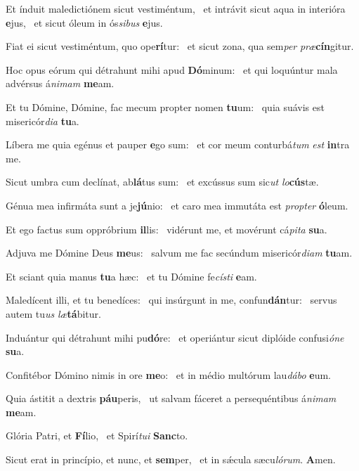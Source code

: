 \item Et índuit maledictiónem sicut vestiméntum,~\pscross{} et intrávit sicut aqua in interióra \textbf{e}jus,~\psstar{} et sicut óleum in ós\textit{sibus} \textbf{e}jus.
\item Fiat ei sicut vestiméntum, quo ope\textbf{rí}tur:~\psstar{} et sicut zona, qua sem\textit{per} \textit{præ}\textbf{cín}gitur.
\item Hoc opus eórum qui détrahunt mihi apud \textbf{Dó}minum:~\psstar{} et qui loquúntur mala advérsus á\textit{nimam} \textbf{me}am.
\item Et tu Dómine, Dómine, fac mecum propter nomen \textbf{tu}um:~\psstar{} quia suávis est misericór\textit{dia} \textbf{tu}a.
\item Líbera me quia egénus et pauper \textbf{e}go sum:~\psstar{} et cor meum conturbá\textit{tum} \textit{est} \textbf{in}tra me.
\item Sicut umbra cum declínat, ab\textbf{lá}tus sum:~\psstar{} et excússus sum sic\textit{ut} \textit{lo}\textbf{cús}tæ.
\item Génua mea infirmáta sunt a je\textbf{jú}nio:~\psstar{} et caro mea immutáta est \textit{propter} \textbf{ó}leum.
\item Et ego factus sum oppróbrium \textbf{il}lis:~\psstar{} vidérunt me, et movérunt cá\textit{pita} \textbf{su}a.
\item Adjuva me Dómine Deus \textbf{me}us:~\psstar{} salvum me fac secúndum misericór\textit{diam} \textbf{tu}am.
\item Et sciant quia manus \textbf{tu}a hæc:~\psstar{} et tu Dómine fe\textit{císti} \textbf{e}am.
\item Maledícent illi, et tu benedíces:~\pscross{} qui insúrgunt in me, confun\textbf{dán}tur:~\psstar{} servus autem tu\textit{us} \textit{læ}\textbf{tá}bitur.
\item Induántur qui détrahunt mihi pu\textbf{dó}re:~\psstar{} et operiántur sicut diplóide confusi\textit{óne} \textbf{su}a.
\item Confitébor Dómino nimis in ore \textbf{me}o:~\psstar{} et in médio multórum lau\textit{dábo} \textbf{e}um.
\item Quia ástitit a dextris \textbf{páu}peris,~\psstar{} ut salvam fáceret a persequéntibus á\textit{nimam} \textbf{me}am.
\item Glória Patri, et \textbf{Fí}lio,~\psstar{} et Spirí\textit{tui} \textbf{Sanc}to.
\item Sicut erat in princípio, et nunc, et \textbf{sem}per,~\psstar{} et in sǽcula sæcu\textit{lórum}. \textbf{A}men.
